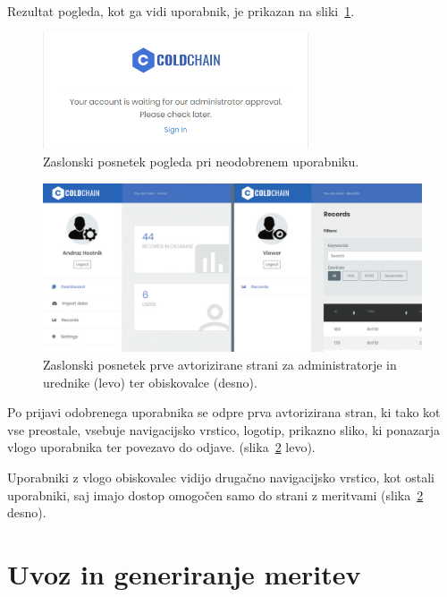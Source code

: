 \documentclass[a4paper, 12pt]{book}
\begin{document}
Rezultat pogleda, kot ga vidi uporabnik, je prikazan na sliki~\ref{ss-approval}.

\begin{figure}[h]
\begin{center}
\includegraphics[width=0.7\textwidth]{slike/approval.png}
\end{center}
\caption{Zaslonski posnetek pogleda pri neodobrenem uporabniku.}
\label{ss-approval}
\end{figure}

\newpage

\begin{figure}[h]
\begin{center}
\includegraphics[width=\textwidth]{slike/logout-obiskovalec.pdf}
\end{center}
\caption{Zaslonski posnetek prve avtorizirane strani za administratorje in urednike (levo) ter obiskovalce (desno).}
\label{ss-obiskovalec}
\end{figure}

Po prijavi odobrenega uporabnika se odpre prva avtorizirana stran, ki tako kot vse preostale, vsebuje navigacijsko vrstico, logotip, prikazno sliko, ki ponazarja vlogo uporabnika ter povezavo do odjave. (slika~\ref{ss-obiskovalec} levo).

Uporabniki z vlogo obiskovalec vidijo drugačno navigacijsko vrstico, kot ostali uporabniki, saj imajo dostop omogočen samo do strani z meritvami (slika~\ref{ss-obiskovalec} desno). 



\section{Uvoz in generiranje meritev}
\label{uvoz-in-generiranje-meritev}
\end{document}
